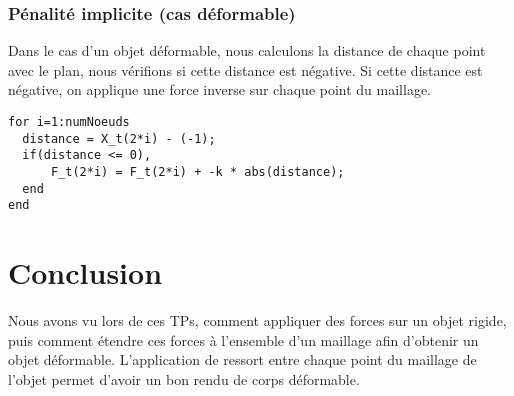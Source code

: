 \documentclass[a4paper,11pt]{article}
\begin{document}
\subsubsection{Pénalité implicite (cas déformable)}
Dans le cas d'un objet déformable, nous calculons la distance de chaque point avec le plan, nous 
vérifions si cette distance est négative. Si cette distance est négative, on applique une force inverse
sur chaque point du maillage.
\begin{lstlisting}
for i=1:numNoeuds
  distance = X_t(2*i) - (-1);
  if(distance <= 0),
      F_t(2*i) = F_t(2*i) + -k * abs(distance);            
  end 
end
\end{lstlisting}


% 
% 
% 
%     
%     
%     
\section{Conclusion}
Nous avons vu lors de ces TPs, comment appliquer des forces sur un objet rigide, puis comment
étendre ces forces à l'ensemble d'un maillage afin d'obtenir un objet déformable. L'application
de ressort entre chaque point du maillage de l'objet permet d'avoir un bon rendu de corps déformable.
\end{document}
